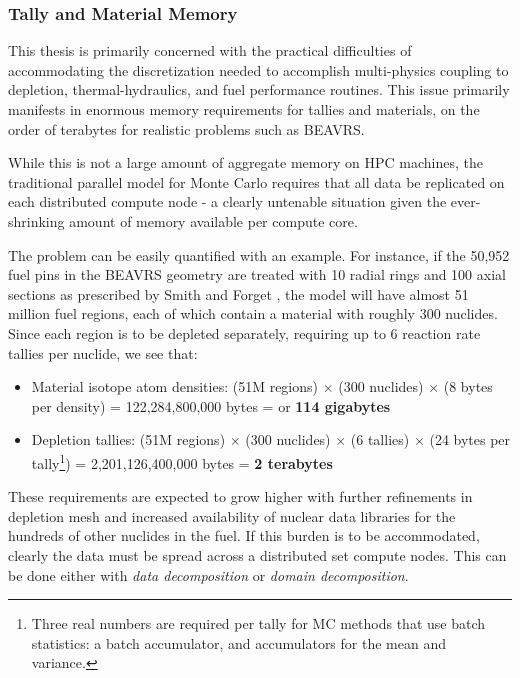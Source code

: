 \documentclass[12pt,twoside]{mitthesis-exec}
\begin{document}
\subsubsection*{Tally and Material Memory}

This thesis is primarily concerned with the practical difficulties of
accommodating the discretization needed to accomplish multi-physics coupling to
depletion, thermal-hydraulics, and fuel performance routines. This issue
primarily manifests in enormous memory requirements for tallies and materials,
on the order of terabytes for realistic problems such as BEAVRS.

While this is not a large amount of aggregate memory on HPC machines, the
traditional parallel model for Monte Carlo requires that all data be replicated
on each distributed compute node - a clearly untenable situation given the
ever-shrinking amount of memory available per compute core.

The problem can be easily quantified with an example. For instance, if the
50,952 fuel pins in the BEAVRS geometry are treated with 10 radial rings and 100
axial sections as prescribed by Smith and Forget \cite{Smith_Forget_2013}, the
model will have almost 51 million fuel regions, each of which contain a
material with roughly 300 nuclides. Since each region is to be depleted
separately, requiring up to 6 reaction rate tallies per nuclide, we see that:

\begin{itemize}
  \item Material isotope atom densities: (51M regions) $\times$ (300 nuclides)
  $\times$ (8 bytes per density) = 122,284,800,000 bytes = or \textbf{114
  gigabytes}
  \item Depletion tallies: (51M regions) $\times$ (300 nuclides) $\times$ (6
  tallies) $\times$ (24 bytes per tally\footnote{Three real numbers are required per tally for MC methods that use batch statistics: a batch accumulator, and accumulators for the mean and variance.}) = 2,201,126,400,000 bytes = \textbf{2
  terabytes}
\end{itemize}

These requirements are expected to grow higher with further refinements in
 depletion mesh and increased availability of nuclear data libraries for the
hundreds of other nuclides in the fuel. If this burden is to be accommodated,
clearly the data must be spread across a distributed set compute nodes. This can
be done either with \emph{data decomposition} or \emph{domain decomposition}.
\end{document}
